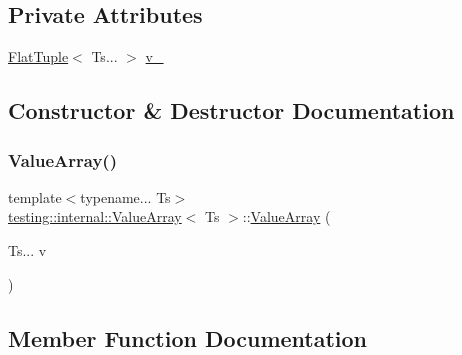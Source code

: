 \subsection*{Private Attributes}
\begin{DoxyCompactItemize}
\item 
\hyperlink{classtesting_1_1internal_1_1FlatTuple}{Flat\+Tuple}$<$ Ts... $>$ \hyperlink{classtesting_1_1internal_1_1ValueArray_a13322bd870795fdd18dde7f95c4cedb0}{v\+\_\+}
\end{DoxyCompactItemize}


\subsection{Constructor \& Destructor Documentation}
\mbox{\label{classtesting_1_1internal_1_1ValueArray_acd7cd6a969a7e95152eac1787c42c9ed}} 
\subsubsection{\texorpdfstring{Value\+Array()}{ValueArray()}}
{\footnotesize\ttfamily template$<$typename... Ts$>$ \\
\hyperlink{classtesting_1_1internal_1_1ValueArray}{testing\+::internal\+::\+Value\+Array}$<$ Ts $>$\+::\hyperlink{classtesting_1_1internal_1_1ValueArray}{Value\+Array} (\begin{DoxyParamCaption}\item[{Ts...}]{v }\end{DoxyParamCaption})\hspace{0.3cm}{\ttfamily [inline]}}



\subsection{Member Function Documentation}
\mbox{\label{classtesting_1_1internal_1_1ValueArray_a738073a57459083586285f5055aeac19}} 
